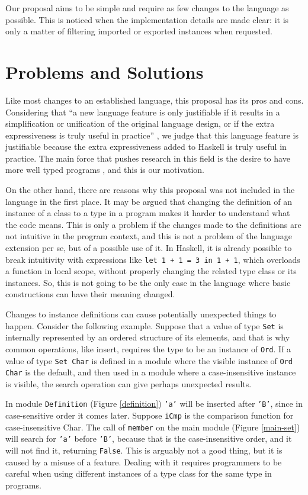 \documentclass[msc]{ppgccufmg}
\begin{document}
Our proposal aims to be simple and require as few changes to the
language as possible. This is noticed when the implementation details
are made clear: it is only a matter of filtering imported or exported
instances when requested.

\section{Problems and Solutions}
Like most changes to an established language, this proposal has
its pros and cons.  Considering that ``a new language feature is only
justifiable if it results in a simplification or unification of the
original language design, or if the extra expressiveness is truly
useful in practice'' \citep[p.~1]{tc}, we judge that this language
feature is justifiable because the extra expressiveness added to
Haskell is truly useful in practice.  The main force that pushes
research in this field is the desire to have more well typed programs
\citep[p.~3]{pierce}, and this is our motivation.

On the other hand, there are reasons why this proposal was not included in the
language in the first place.  
It may be argued that changing the definition of
an instance of a class to a type in a program makes it harder to understand
what the code means.  
This is only a problem if the changes made to the
definitions are not intuitive in the program context, and this is not a problem
of the language extension per se, but of a possible use of it.  In Haskell,
it is already possible to break intuitivity with expressions like \texttt{let 1 + 1 = 3
in 1 + 1}, which overloads a function in local scope, without properly changing
the related type class or its instances.  So, this is not going to be the only
case in the language where basic constructions can have their meaning changed.

Changes to instance definitions can cause potentially unexpected
things to happen. Consider the following example. Suppose that a value
of type \texttt{Set} is internally represented by an ordered structure
of its elements, and that is why common operations, like insert,
requires the type to be an instance of \texttt{Ord}.  If a value of
type \texttt{Set Char} is defined in a module where the visible
instance of \texttt{Ord Char} is the default, and then used in a
module where a case-insensitive instance is visible, the search
operation can give perhaps unexpected results.

In module \texttt{Definition} (Figure \ref{definition}) \texttt{'a'}
will be inserted after \texttt{'B'}, since in case-sensitive order it
comes later.  Suppose \texttt{iCmp} is the comparison function
for case-insensitive Char.  The call of \texttt{member} on the main module
(Figure
\ref{main-set}) will search for \texttt{'a'} before \texttt{'B'},
because that is the case-insensitive order, and it will not find it,
returning \texttt{False}.  This is arguably not a good thing, but it is caused
by a misuse of a
feature. Dealing with it requires programmers to be careful when using
different instances of a type class for the same type in programs.
\end{document}
